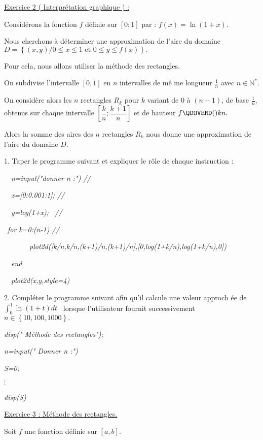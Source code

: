 \documentclass{article}
\begin{document}
\underline{Exercice 2 ( Interpr\'{e}tation graphique ) :}

Consid\'{e}rons la fonction $f$ d\'{e}finie sur $\left[ 0;1\right] $ par : $%
f(x)=\ln (1+x).$

Nous cherchons \`{a} d\'{e}terminer une approximation de l'aire du domaine $%
D=\left\{ \left( x,y\right) /0\leq x\leq 1\text{ et }0\leq y\leq
f(x)\right\} .$

Pour cela, nous allons utiliser la m\'{e}thode des rectangles.

On subdivise l'intervalle $\left[ 0,1\right] $ en $n$ intervalles de m\^{e}%
me longueur $\frac{1}{n}$ avec $n\in 
\mathbb{N}
^{\ast }.$

On consid\`{e}re alors les $n$ rectangles $R_{k}$ pour $k$ variant de $0$ 
\`{a} $\left( n-1\right) $, de base $\frac{1}{n},$ obtenus sur chaque
intervalle $\left[ \dfrac{k}{n};\dfrac{k+1}{n}\right] $ et de hauteur $%
f\QDOVERD( ) {k}{n}.$

Alors la somme des aires des $n$ rectangles $R_{k}$ nous donne une
approximation de l'aire du domaine $D.$

1. Taper le programme suivant et expliquer le r\^{o}le de chaque instruction
:

\ \ \textit{n=input("donner n :") //}

\ \ \textit{x=[0:0.001:1]; //}

\ \ \textit{y=log(1+x); \ //}

\ \textit{for k=0:(n-1) //}

\textit{\ \ \ \ \ \ \
plot2d([k/n,k/n,(k+1)/n,(k+1)/n],[0,log(1+k/n),log(1+k/n),0])}

\ \ \textit{end}

\ \ \textit{plot2d(x,y,style=4)}

2. Compl\'{e}ter le programme suivant afin qu'il calcule une valeur approch%
\'{e}e de $\int_{0}^{1}\ln (1+t)dt$ \ lorsque l'utilisateur fournit
successivement $n\in \left\{ 10,100,1000\right\} .$

\textit{disp(" M\'{e}thode des rectangles");}

\textit{n=input(" Donner n :")}

\textit{S=0;}

$\mathit{\vdots }$

\textit{disp(S)}

\bigskip

\bigskip \underline{Exercice 3 : M\'{e}thode des rectangles.}

Soit $f$ une fonction d\'{e}finie sur $\left[ a,b\right] .$
\end{document}
